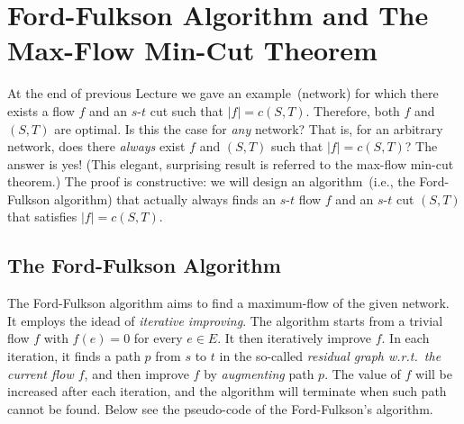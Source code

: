 \setcounter{definition}{0} \setcounter{property}{0} \setcounter{claim}{0} \setcounter{fact}{0} \setcounter{corollary}{0} \setcounter{figure}{0}
\section{Ford-Fulkson Algorithm and The Max-Flow Min-Cut Theorem}


At the end of previous Lecture we gave an example~(network) for which
there exists a flow $f$ and an $s$-$t$ cut such that $|f| = c(S, T)$.
Therefore, both $f$ and $(S,T)$ are optimal.
Is this the case for \emph{any} network?
That is, for an arbitrary network,
does there \emph{always} exist $f$ and $(S,T)$ such that $|f| = c(S,T)$?
The answer is yes! (This elegant, surprising result is referred to the max-flow min-cut theorem.)
The proof is constructive: we will design an algorithm~(i.e., the Ford-Fulkson algorithm)
that actually always finds an $s$-$t$ flow $f$ and an $s$-$t$ cut $(S, T)$ that satisfies $|f| = c(S, T)$.

\subsection*{The Ford-Fulkson Algorithm}

The Ford-Fulkson algorithm aims to find a maximum-flow of the given network.
It employs the idead of \emph{iterative improving}. The algorithm
starts from a trivial flow $f$ with $f(e) = 0$ for every $e\in E$.
It then iteratively improve $f$.
In each iteration, it finds a path $p$ from $s$ to $t$ in the so-called \emph{residual graph w.r.t.\ the current flow $f$},
and then improve $f$ by \emph{augmenting} path $p$.
The value of $f$ will be increased after each iteration,
and the algorithm will terminate when such path cannot be found.
Below see the pseudo-code of the Ford-Fulkson's algorithm.

\begin{minipage}{0.8\textwidth}
	\xxx
	\xxx
	\xxx
	\xxx
	\xxx
	\xxx
	\xxx
	\xxx
	\xxx
\end{minipage}



